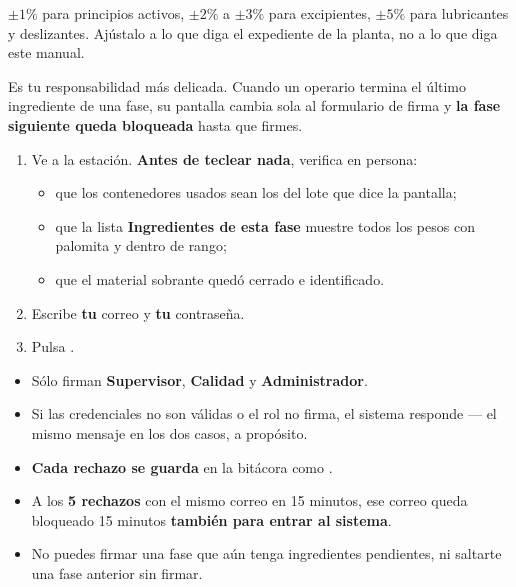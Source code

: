 \begin{cajaTip}
$\pm 1\%$ para principios activos, $\pm 2\%$ a $\pm 3\%$ para excipientes,
$\pm 5\%$ para lubricantes y deslizantes. Ajústalo a lo que diga el expediente
de la planta, no a lo que diga este manual.
\end{cajaTip}


\newpage
{}

Es tu responsabilidad más delicada. Cuando un operario termina el último ingrediente
de una fase, su pantalla cambia sola al formulario de firma y \textbf{la fase
siguiente queda bloqueada} hasta que firmes.



\begin{enumerate}
    \item Ve a la estación. \textbf{Antes de teclear nada}, verifica en persona:
        \begin{itemize}
            \item que los contenedores usados sean los del lote que dice la pantalla;
            \item que la lista \textbf{Ingredientes de esta fase} muestre todos los
                  pesos con palomita y dentro de rango;
            \item que el material sobrante quedó cerrado e identificado.
        \end{itemize}
    \item Escribe \textbf{tu} correo y \textbf{tu} contraseña.
    \item Pulsa .
\end{enumerate}


\begin{itemize}
    \item Sólo firman \textbf{Supervisor}, \textbf{Calidad} y \textbf{Administrador}.
    \item Si las credenciales no son válidas o el rol no firma, el sistema responde
           --- el mismo mensaje en los dos casos, a propósito.
    \item \textbf{Cada rechazo se guarda} en la bitácora como .
    \item A los \textbf{5 rechazos} con el mismo correo en 15 minutos, ese correo queda
          bloqueado 15 minutos \textbf{también para entrar al sistema}.
    \item No puedes firmar una fase que aún tenga ingredientes pendientes, ni saltarte
          una fase anterior sin firmar.
\end{itemize}

